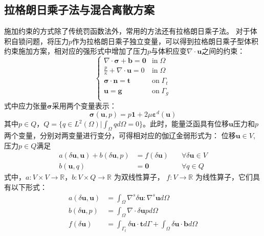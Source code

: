 \subsection{拉格朗日乘子法与混合离散方案}
施加约束的方式除了传统罚函数法外，常用的方法还有拉格朗日乘子法。
对于体积自锁问题，将压力$p$作为拉格朗日乘子独立变量，可以得到拉格朗日乘子型体积约束施加方案，相对应的强形式中增加了压力$p$与体积应变$\nabla \cdot \boldsymbol u$之间的约束：
\begin{equation}\label{strong_mix}
    \begin{cases}
        \nabla \cdot \boldsymbol \sigma + \boldsymbol b = \boldsymbol 0 & \mathrm{in} \; \Omega \\
        \frac{p}{\kappa} + \nabla \cdot \boldsymbol u = 0 & \mathrm{in} \; \Omega \\
        \boldsymbol \sigma \cdot \boldsymbol n = \boldsymbol t & \mathrm{on} \; \Gamma_t \\
        \boldsymbol u = \boldsymbol g & \mathrm{on} \; \Gamma_g \\
    \end{cases}
\end{equation}
式中应力张量$\boldsymbol \sigma$采用两个变量表示：
\begin{equation}\label{stress_mix}
    \boldsymbol \sigma(\boldsymbol u, p) = p \boldsymbol 1 + 2\mu \boldsymbol \varepsilon^d(\boldsymbol u)
\end{equation}
其中$p\in Q$，$Q = \{q \in L^2(\Omega) \vert \int_{\Omega} q d\Omega = 0\}$。此时，能量泛函具有位移$\boldsymbol u$压力和$p$两个变量，分别对两变量进行变分，可得相对应的伽辽金弱形式为：
位移$\boldsymbol u \in V$, 压力$p \in Q$满足
\begin{equation}\label{weak_mix}
    \begin{aligned}
        a(\delta \boldsymbol u, \boldsymbol u) + b(\delta \boldsymbol u, p) &= f(\delta \boldsymbol u) \quad &\forall \delta \boldsymbol u \in V \\
        b(\boldsymbol u, q) &= \boldsymbol 0 \quad &\forall q \in Q
    \end{aligned}
\end{equation}
式中，$a: V\times V\rightarrow \mathbb R$，$b: V\times Q\rightarrow \mathbb R$ 为双线性算子， $f: V \rightarrow \mathbb R$ 为线性算子，它们具有以下形式：
\begin{align}
    a(\delta \boldsymbol u, \boldsymbol u) &= \int_\Omega \nabla^s \delta \boldsymbol u: \nabla^s \boldsymbol u d\Omega \\
    b(\delta \boldsymbol u, p) &= \int_\Omega \nabla \cdot \delta \boldsymbol u p d\Omega \\
    f(\delta \boldsymbol u) &= \int_{\Gamma_t} \delta \boldsymbol u \cdot \boldsymbol t d\Gamma + \int_{\Omega} \delta \boldsymbol u \cdot \boldsymbol b d\Omega
\end{align}

